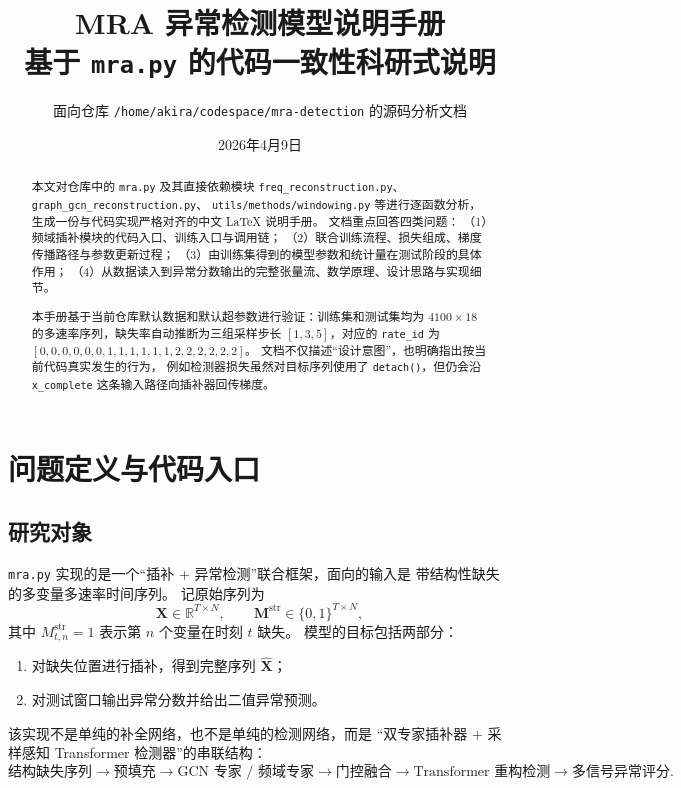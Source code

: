 \documentclass[UTF8,11pt,a4paper]{ctexart}
\title{MRA 异常检测模型说明手册\\
\large 基于 \texttt{mra.py} 的代码一致性科研式说明}
\author{面向仓库 \texttt{/home/akira/codespace/mra-detection} 的源码分析文档}
\date{2026年4月9日}
\begin{document}
\maketitle

\begin{abstract}
本文对仓库中的 \texttt{mra.py} 及其直接依赖模块
\texttt{freq\_reconstruction.py}、
\texttt{graph\_gcn\_reconstruction.py}、
\texttt{utils/methods/windowing.py} 等进行逐函数分析，
生成一份与代码实现严格对齐的中文 LaTeX 说明手册。
文档重点回答四类问题：
（1）频域插补模块的代码入口、训练入口与调用链；
（2）联合训练流程、损失组成、梯度传播路径与参数更新过程；
（3）由训练集得到的模型参数和统计量在测试阶段的具体作用；
（4）从数据读入到异常分数输出的完整张量流、数学原理、设计思路与实现细节。

本手册基于当前仓库默认数据和默认超参数进行验证：训练集和测试集均为
$4100\times 18$ 的多速率序列，缺失率自动推断为三组采样步长
$[1,3,5]$，对应的 \texttt{rate\_id} 为
$[0,0,0,0,0,0,1,1,1,1,1,1,2,2,2,2,2,2]$。
文档不仅描述“设计意图”，也明确指出按当前代码真实发生的行为，
例如检测器损失虽然对目标序列使用了 \texttt{detach()}，但仍会沿
\texttt{x\_complete} 这条输入路径向插补器回传梯度。
\end{abstract}

\tableofcontents
\newpage

\section{问题定义与代码入口}

\subsection{研究对象}

\texttt{mra.py} 实现的是一个“插补 + 异常检测”联合框架，面向的输入是
带结构性缺失的多变量多速率时间序列。
记原始序列为
\[
\bm{X}\in\mathbb{R}^{T\times N},
\qquad
\bm{M}^{\mathrm{str}}\in\{0,1\}^{T\times N},
\]
其中 $M^{\mathrm{str}}_{t,n}=1$ 表示第 $n$ 个变量在时刻 $t$ 缺失。
模型的目标包括两部分：
\begin{enumerate}
  \item 对缺失位置进行插补，得到完整序列 $\hat{\bm{X}}$；
  \item 对测试窗口输出异常分数并给出二值异常预测。
\end{enumerate}

该实现不是单纯的补全网络，也不是单纯的检测网络，而是
“双专家插补器 + 采样感知 Transformer 检测器”的串联结构：
\[
\text{结构缺失序列}
\rightarrow
\text{预填充}
\rightarrow
\text{GCN 专家 / 频域专家}
\rightarrow
\text{门控融合}
\rightarrow
\text{Transformer 重构检测}
\rightarrow
\text{多信号异常评分}.
\]
\end{document}
